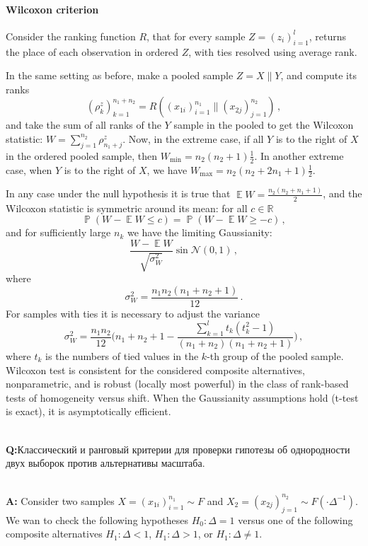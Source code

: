 \documentclass[a4paper]{article}
\newcommand{\Ncal}{\mathcal{N}}
\newcommand{\ex}{\mathop{\mathbb{E}}\nolimits}
\newcommand{\pr}{\mathop{\mathbb{P}}\nolimits}
\newcommand{\rus}[1]{\foreignlanguage{russian}{#1}}
\begin{document}
\paragraph{Wilcoxon criterion} %
\label{par:wilcoxon_criterion}
Consider the ranking function $R$, that for every sample $Z=(z_i)_{i=1}^l$, returns
the place of each observation in ordered $Z$, with ties resolved using average rank.

In the same setting as before, make a pooled sample $Z = X \| Y$, and compute its
ranks
$$ (\rho^z_k)_{k=1}^{n_1+n_2} = R((x_{1i})_{i=1}^{n_1}\|(x_{2j})_{j=1}^{n_2}) \,, $$
and take the sum of all ranks of the $Y$ sample in the pooled to get the Wilcoxon
statistic: $ W = \sum_{j=1}^{n_2} \rho^z_{n_1+j} $. Now, in the extreme case, if
all $Y$ is to the right of $X$ in the ordered pooled sample, then $W_{\text{min}}
= n_2 (n_2+1)\frac{1}{2}$. In another extreme case, when $Y$ is to the right of $X$,
we have $W_{\text{max}} = n_2(n_2 + 2n_1 + 1) \frac{1}{2}$.

In any case under the null hypothesis it is true that $ \ex W = \frac{n_2 (n_2 + n_1 + 1)}{2}$,
and the Wilcoxon statistic is symmetric around its mean: for all $c\in \mathbb{R}$
$$ \pr(W - \ex W \leq c) = \pr(W - \ex W \geq -c) \,, $$
and for sufficiently large $n_k$ we have the limiting Gaussianity:
$$ \frac{W - \ex W}{\sqrt{\sigma^2_W}} \sin \Ncal(0, 1) \,, $$
where 
$$ \sigma^2_W = \frac{n_1 n_2 (n_1+n_2+1)}{12} \,. $$
For samples with ties it is necessary to adjust the variance
$$ \sigma^2_W
    = \frac{n_1 n_2}{12} \biggl(n_1+n_2+1
        -\frac{\sum_{k=1}^l t_k(t_k^2-1)}{(n_1+n_2)(n_1+n_2+1)}
    \biggr) \,, $$
where $t_k$ is the numbers of tied values in the $k$-th group of the pooled sample.
Wilcoxon test is consistent for the considered composite alternatives, nonparametric,
and is robust (locally most powerful) in the class of rank-based tests of homogeneity
versus shift. When the Gaussianity assumptions hold (t-test is exact), it is asymptotically
efficient.


\hfill\\\noindent\textbf{Q:}\rus{Классический и ранговый критерии для проверки гипотезы
об однородности двух выборок против альтернативы масштаба.}

\hfill\\\noindent\textbf{A:}
Consider two samples $X=(x_{1i})_{i=1}^{n_1}\sim F$ and $X_2=(x_{2j})_{j=1}^{n_2}
\sim F(\cdot\Delta^{-1})$. We wan to check the following hypotheses $H_0: \Delta=1$
versus one of the following composite alternatives $H_1: \Delta < 1$, $H_1: \Delta > 1$,
or $H_1: \Delta \neq 1$.
\end{document}
